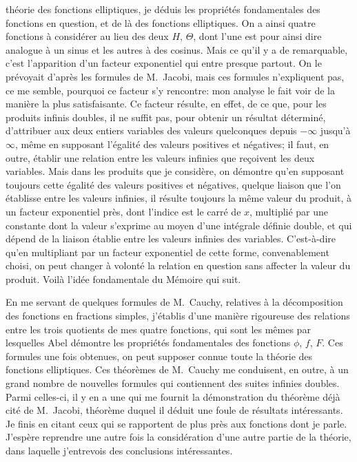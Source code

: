 \documentclass[12pt,a4paper]{article}
\begin{document}
th\'eorie des fonctions elliptiques, je d\'eduis les propri\'et\'es fondamentales des fonctions en question, et de l\`a des fonctions elliptiques. On a ainsi quatre fonctions \`a consid\'erer au lieu des deux $H$, $\Theta$, dont l'une est pour ainsi dire analogue \`a un sinus et les autres \`a des cosinus. Mais ce qu'il y a de remarquable, c'est l'apparition d'un facteur exponentiel qui entre presque partout. On le pr\'evoyait d'apr\`es les formules de M.~Jacobi, mais ces formules n'expliquent pas, ce me semble, pourquoi ce facteur s'y rencontre: mon analyse le fait voir de la mani\`ere la plus satisfaisante. Ce facteur r\'esulte, en effet, de ce que, pour les produits infinis doubles, il ne suffit pas, pour obtenir un r\'esultat d\'etermin\'e, d'attribuer aux deux entiers variables des valeurs quelconques depuis $-\infty$ jusqu'\`a $\infty$, m\^eme en supposant l'\'egalit\'e des valeurs positives et n\'egatives; il faut, en outre, \'etablir une relation entre les valeurs infinies que re\c{c}oivent les deux variables. Mais dans les produits que je consid\`ere, on d\'emontre qu'en supposant toujours cette \'egalit\'e des valeurs positives et n\'egatives, quelque liaison que l'on \'etablisse entre les valeurs infinies, il r\'esulte toujours la m\^eme valeur du produit, \`a un facteur exponentiel pr\`es, dont l'indice est le carr\'e de $x$, multipli\'e par une constante dont la valeur s'exprime au moyen d'une int\'egrale d\'efinie double, et qui d\'epend de la liaison \'etablie entre les valeurs infinies des variables. C'est-\`a-dire qu'en multipliant par un facteur exponentiel de cette forme, convenablement choisi, on peut changer \`a volont\'e la relation en question sans affecter la valeur du produit. Voil\`a l'id\'ee fondamentale du M\'emoire qui suit.

En me servant de quelques formules de M.~Cauchy, relatives \`a la d\'ecomposition des fonctions en fractions simples, j'\'etablis d'une mani\`ere rigoureuse des relations entre les trois quotients de mes quatre fonctions, qui sont les m\^emes par lesquelles Abel d\'emontre les propri\'et\'es fondamentales des fonctions $\phi$, $f$, $F$. Ces formules une fois obtenues, on peut supposer connue toute la th\'eorie des fonctions elliptiques. Ces th\'eor\`emes de M.~Cauchy me conduisent, en outre, \`a un grand nombre de nouvelles formules qui contiennent des suites infinies doubles. Parmi celles-ci, il y en a une qui me fournit la d\'emonstration du th\'eor\`eme d\'ej\`a cit\'e de M.~Jacobi, th\'eor\`eme duquel il d\'eduit une foule de r\'esultats int\'eressants. Je finis en citant ceux qui se rapportent de plus pr\`es aux fonctions dont je parle. J'esp\`ere reprendre une autre fois la consid\'eration d'une autre partie de la th\'eorie, dans laquelle j'entrevois des conclusions int\'eressantes.
\end{document}
